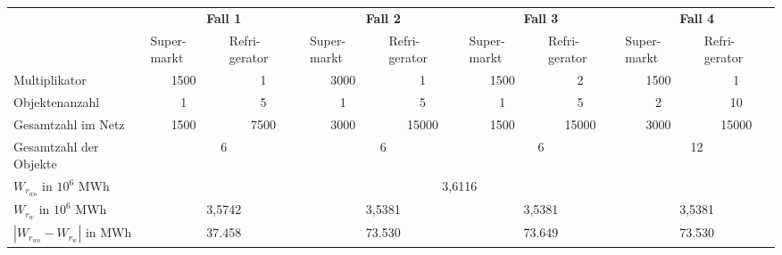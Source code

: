 % 
\begin{table}
\footnotesize{
\centering
\begin{tabularx}{\textwidth}{X|X|X|X|X|X|X|X|X|}
\cline{2-9}
& \multicolumn{2}{c|}{\textbf{Fall 1}} & \multicolumn{2}{c|}{\textbf{Fall 2}}
&  \multicolumn{2}{c|}{\textbf{Fall 3}} &  \multicolumn{2}{c|}{\textbf{Fall 4}}\\
 \cline{2-9}
& Super- \linebreak markt & Refri- \linebreak gerator & Super- \linebreak markt
& Refri- \linebreak gerator & Super- \linebreak markt & Refri-\linebreak gerator
& Super- \linebreak markt & Refri-\linebreak gerator \\
\hline
\multicolumn{1}{|l|}{Multiplikator} & \multicolumn{1}{c|}{1500} &
\multicolumn{1}{c|}{1} & \multicolumn{1}{c|}{3000} & \multicolumn{1}{c|}{1} &
\multicolumn{1}{c|}{1500} & \multicolumn{1}{c|}{2} & \multicolumn{1}{c|}{1500} &
\multicolumn{1}{c|}{1} \\
\hline
\multicolumn{1}{|l|}{Objektenanzahl} & \multicolumn{1}{c|}{1} &
\multicolumn{1}{c|}{5}& \multicolumn{1}{c|}{1} & \multicolumn{1}{c|}{5} &
\multicolumn{1}{c|}{1}& \multicolumn{1}{c|}{5} & \multicolumn{1}{c|}{2}&
\multicolumn{1}{c|}{10} \\
\hline
\multicolumn{1}{|l|}{Gesamtzahl im Netz} & \multicolumn{1}{c|}{1500} &
\multicolumn{1}{c|}{7500}& \multicolumn{1}{c|}{3000} & \multicolumn{1}{c|}{15000} &
\multicolumn{1}{c|}{1500} & \multicolumn{1}{c|}{15000} & \multicolumn{1}{c|}{3000}&
\multicolumn{1}{c|}{15000} \\
\hline
\multicolumn{1}{|l|}{Gesamtzahl der Objekte} & \multicolumn{2}{c|}{6} &
\multicolumn{2}{c|}{6} & \multicolumn{2}{c|}{6} & \multicolumn{2}{c|}{12}\\
\hline
\hline
\multicolumn{1}{|l|}{$W_{r_{wo}}$ in $10^6$ MWh } & \multicolumn{8}{c|}{3,6116}\\
\hline
\multicolumn{1}{|l|}{$W_{r_{w}}$ in $10^6$ MWh} & \multicolumn{2}{c|}{3,5742} &
\multicolumn{2}{c|}{3,5381} &
\multicolumn{2}{c|}{3,5381} &
\multicolumn{2}{c|}{3,5381}\\
\hline
\multicolumn{1}{|l|}{$|W_{r_{wo}} - W_{r_{w}}|$ in MWh} &
\multicolumn{2}{c|}{37.458} &
\multicolumn{2}{c|}{73.530} &
\multicolumn{2}{c|}{73.649} &
\multicolumn{2}{c|}{73.530}\\

\end{tabularx}}
\end{table}

